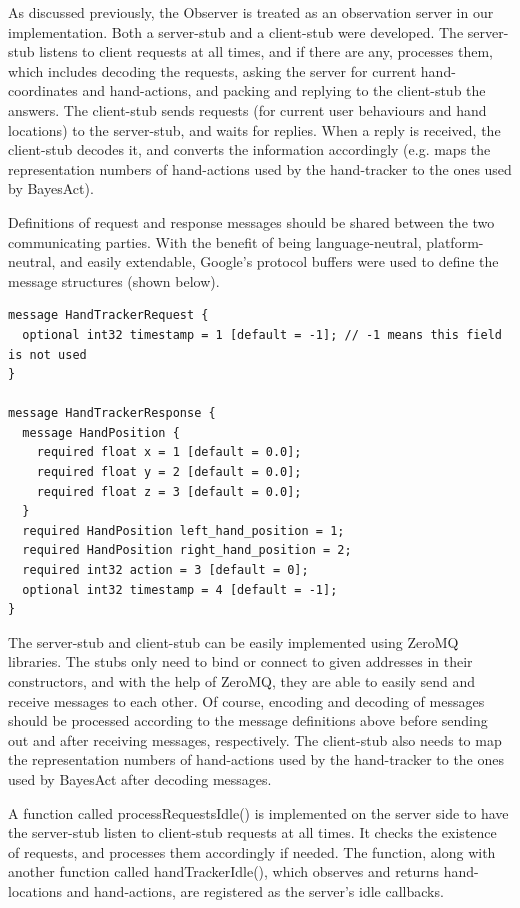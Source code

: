 As discussed previously, the Observer is treated as an observation server in our implementation. Both a server-stub and a client-stub were developed. The server-stub listens to client requests at all times, and if there are any, processes them, which includes decoding the requests, asking the server for current hand-coordinates and hand-actions, and packing and replying to the client-stub the answers. The client-stub sends requests (for current user behaviours and hand locations) to the server-stub, and waits for replies. When a reply is received, the client-stub decodes it, and converts the information accordingly (e.g. maps the representation numbers of hand-actions used by the hand-tracker to the ones used by BayesAct).

Definitions of request and response messages should be shared between the two communicating parties. With the benefit of being language-neutral, platform-neutral, and easily extendable, Google's protocol buffers were used to define the message structures (shown below).

\begin{verbatim}
message HandTrackerRequest {
  optional int32 timestamp = 1 [default = -1]; // -1 means this field is not used
}

message HandTrackerResponse {
  message HandPosition {
    required float x = 1 [default = 0.0];
    required float y = 2 [default = 0.0];
    required float z = 3 [default = 0.0];
  }
  required HandPosition left_hand_position = 1;
  required HandPosition right_hand_position = 2;
  required int32 action = 3 [default = 0];
  optional int32 timestamp = 4 [default = -1];
}
\end{verbatim}

The server-stub and client-stub can be easily implemented using ZeroMQ libraries. The stubs only need to bind or connect to given addresses in their constructors, and with the help of ZeroMQ, they are able to easily send and receive messages to each other. Of course, encoding and decoding of messages should be processed according to the message definitions above before sending out and after receiving messages, respectively. The client-stub also needs to map the representation numbers of hand-actions used by the hand-tracker to the ones used by BayesAct after decoding messages.

A function called processRequestsIdle() is implemented on the server side to have the server-stub listen to client-stub requests at all times. It checks the existence of requests, and processes them accordingly if needed. The function, along with another function called handTrackerIdle(), which observes and returns hand-locations and hand-actions, are registered as the server's idle callbacks.


